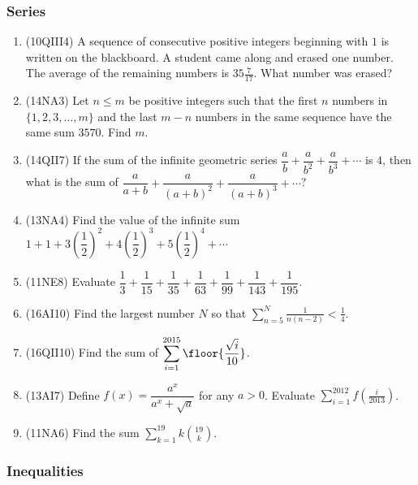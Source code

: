 \documentclass[10pt,paper=letter]{scrartcl}
\begin{document}
\subsubsection*{Series}

\begin{enumerate}

\item (10QIII4) A sequence of consecutive positive integers beginning with $1$ is written on the blackboard. A student came along and erased one number. The average of the remaining numbers is $35 \frac{7}{17}$. What number was erased?

\item (14NA3) Let $n \leq m$ be positive integers such that the first $n$ numbers in $\{1,2,3,\ldots,m\}$ and the last $m-n$ numbers in the same sequence have the same sum $3570$. Find $m$.

\item (14QII7) If the sum of the infinite geometric series $\dfrac{a}{b} + \dfrac{a}{b^2} + \dfrac{a}{b^3} + \cdots$ is $4$, then what is the sum of $\dfrac{a}{a+b} + \dfrac{a}{(a+b)^2} + \dfrac{a}{(a+b)^3} + \cdots$?

\item (13NA4) Find the value of the infinite sum $1 + 1 + 3\left(\dfrac{1}{2}\right)^2 + 4\left(\dfrac{1}{2}\right)^3 + 5\left(\dfrac{1}{2}\right)^4 + \cdots$

\item (11NE8) Evaluate $\dfrac{1}{3} + \dfrac{1}{15} + \dfrac{1}{35} + \dfrac{1}{63} + \dfrac{1}{99} + \dfrac{1}{143} + \dfrac{1}{195}$.

\item (16AI10) Find the largest number $N$ so that $\displaystyle \sum_{n=5}^N \frac{1}{n(n-2)} < \frac{1}{4}$.

\item (16QII10) Find the sum of $\displaystyle \sum_{i=1}^{2015} \floor{\frac{\sqrt{i}}{10}}$.

\item (13AI7) Define $f(x) = \dfrac{a^x}{a^x + \sqrt{a}}$ for any $a > 0$. Evaluate $\displaystyle \sum_{i = 1}^{2012} f\left( \frac{i}{2013} \right)$.

\item (11NA6) Find the sum $\displaystyle \sum_{k=1}^{19} k \binom{19}{k}$.

\end{enumerate}

\subsubsection*{Inequalities}
\end{document}
